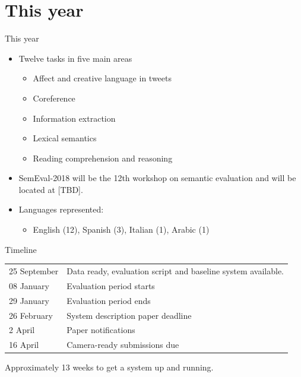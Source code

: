 \documentclass[10pt, compress]{beamer}
\begin{document}

\section{This year}

\begin{frame}{This year}

\begin{itemize}
  \item Twelve tasks in five main areas
  \begin{itemize}
     \item  Affect and creative language in tweets
     \item  Coreference
     \item  Information extraction
     \item  Lexical semantics
     \item  Reading comprehension and reasoning
  \end{itemize}
  \item SemEval-2018 will be the 12th workshop on semantic evaluation and will be located at [TBD]. 
  \item Languages represented:
  \begin{itemize} 
    \item English (12), Spanish (3), Italian (1), Arabic (1)
  \end{itemize}
\end{itemize}
%

\end{frame}

\begin{frame}{Timeline}

\begin{tabular}{ll}

25 September & Data ready, evaluation script and baseline system available. \\
08 January   & Evaluation period starts \\
29 January   & Evaluation period ends \\
26 February  & System description paper deadline \\
2  April     & Paper notifications \\
16 April     & Camera-ready submissions due \\
\end{tabular}

Approximately 13 weeks to get a system up and running.

\end{frame}
\end{document}
